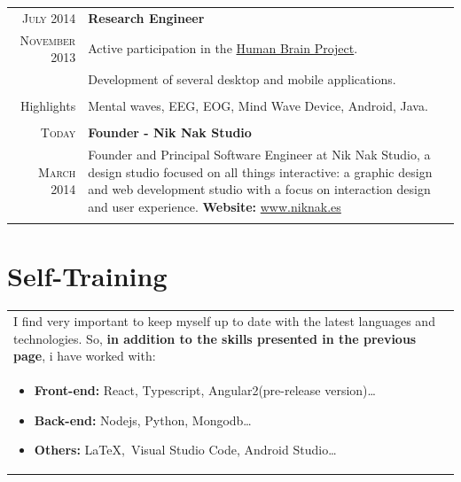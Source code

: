 \documentclass[a4paper,10pt]{article} %
\newcommand{\highlights}{\textcolor{linkcolour}{Highlights}}
\begin{document}
\begin{tabular}{r|p{11cm}}
\textsc{July 2014} & \textbf{Research Engineer} \\
\textsc{November 2013}
& \footnotesize{Active participation in the \href{https://www.humanbrainproject.eu/}{Human
Brain Project}.}\\
& \footnotesize{Development of several desktop and mobile
applications.} \\
& \\ 
\highlights & Mental waves, EEG, EOG,  Mind Wave Device, Android, Java. \\
\multicolumn{2}{c}{} \\

\textsc{Today} & \textbf{Founder - Nik Nak Studio} \\
\textsc{March 2014} 
& \footnotesize{Founder and Principal Software Engineer at Nik Nak Studio,  a
design studio focused on all things interactive: a graphic design and web 
development studio with a focus on interaction design and user experience.
\textbf{Website:}  \url{www.niknak.es}}\\
\multicolumn{2}{c}{} \\

\end{tabular}


\section{Self-Training}

\begin{tabular}{p{146mm}}
I find very important to keep myself up to date with the latest languages and
technologies. So, \textbf{in addition to the skills presented in the previous
page}, i have worked with: \\
\begin{itemize}
  \item \textbf{Front-end:} React, Typescript, Angular2(pre-release
  version)\ldots
  \item \textbf{Back-end:} Nodejs, Python, Mongodb\ldots
  \item \textbf{Others:} \LaTeX,\ Visual Studio Code, Android Studio\ldots
\end{itemize}



\multicolumn{1}{c}{}
\end{tabular}



\end{document}
